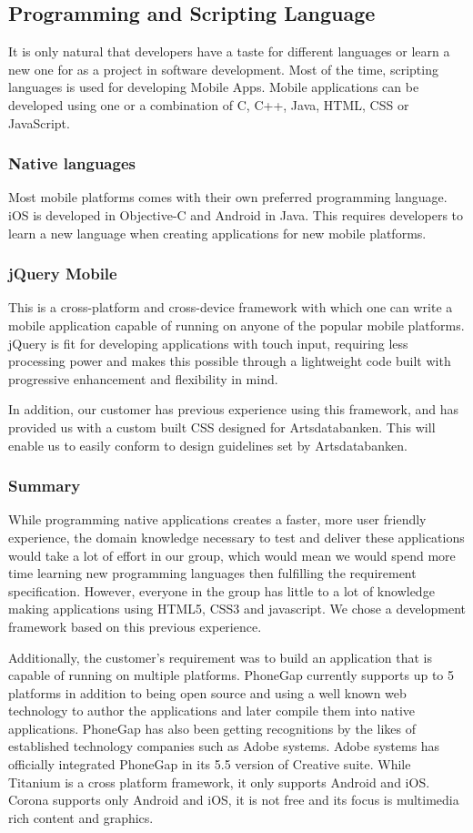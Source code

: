 \subsection{Programming and Scripting Language}
It is only natural that developers have a taste for different languages or
learn a new one for as a project in software development. Most of the time,
scripting languages is used for developing Mobile Apps. Mobile applications
can be developed using one or a combination of C, C++, Java, HTML, CSS or JavaScript.

\subsubsection{Native languages}
Most mobile platforms comes with their own preferred programming language. iOS is developed in Objective-C and Android in Java. This requires developers to learn a new language when creating applications for new mobile platforms.

\subsubsection{jQuery Mobile}
This is a cross-platform and cross-device framework with which one can write
a mobile application capable of running on anyone of the popular mobile platforms.
jQuery is fit for developing applications with touch input, requiring
less processing power and  makes this possible through a lightweight code
built with progressive enhancement and flexibility in mind.

In addition, our customer has previous experience using this framework, and has provided us with a custom built CSS designed for Artsdatabanken. This will enable us to easily conform to design guidelines set by Artsdatabanken.

\subsubsection{Summary}
While programming native applications creates a faster, more user friendly experience, the domain knowledge necessary to test and deliver these applications would take a lot of effort in our group, which would mean we would spend more time learning new programming languages then fulfilling the requirement specification. However, everyone in the group has little to a lot of knowledge making applications using HTML5, CSS3 and javascript. We chose a development framework based on this previous experience. 

Additionally, the customer's requirement was to build an application that is capable of running on multiple platforms. PhoneGap currently supports up to 5 platforms in addition to being open source and using a well known web technology to author the applications and later compile them into native applications. PhoneGap has also been getting recognitions by the likes of established technology companies such as Adobe systems.  Adobe systems has officially integrated PhoneGap in its 5.5 version of Creative suite. While Titanium is a cross platform framework, it only supports Android and iOS. Corona supports only Android and iOS, it is not free and its focus is multimedia rich content and graphics.

